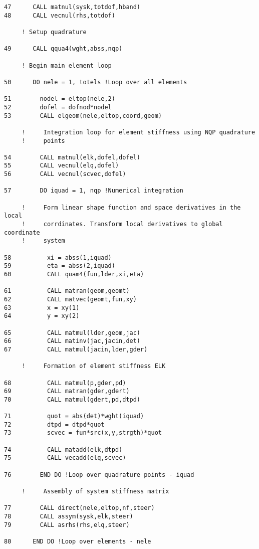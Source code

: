 \begin{verbatim}
47      CALL matnul(sysk,totdof,hband)
48      CALL vecnul(rhs,totdof) 
     
     ! Setup quadrature
     
49      CALL qqua4(wght,abss,nqp)
     
     ! Begin main element loop
     
50      DO nele = 1, totels !Loop over all elements
     
51        nodel = eltop(nele,2)
52        dofel = dofnod*nodel
53        CALL elgeom(nele,eltop,coord,geom)
     
     !     Integration loop for element stiffness using NQP quadrature
     !     points
     
54        CALL matnul(elk,dofel,dofel) 
55        CALL vecnul(elq,dofel)
56        CALL vecnul(scvec,dofel)
     
57        DO iquad = 1, nqp !Numerical integration
     
     !     Form linear shape function and space derivatives in the local
     !     corrdinates. Transform local derivatives to global coordinate
     !     system
     
58          xi = abss(1,iquad)
59          eta = abss(2,iquad)
60          CALL quam4(fun,lder,xi,eta)
     
61          CALL matran(geom,geomt)
62          CALL matvec(geomt,fun,xy) 
63          x = xy(1)
64          y = xy(2)
     
65          CALL matmul(lder,geom,jac) 
66          CALL matinv(jac,jacin,det)
67          CALL matmul(jacin,lder,gder)
     
     !     Formation of element stiffness ELK
     
68          CALL matmul(p,gder,pd)
69          CALL matran(gder,gdert)
70          CALL matmul(gdert,pd,dtpd)
     
71          quot = abs(det)*wght(iquad)
72          dtpd = dtpd*quot
73          scvec = fun*src(x,y,strgth)*quot
     
74          CALL matadd(elk,dtpd)
75          CALL vecadd(elq,scvec)
     
76        END DO !Loop over quadrature points - iquad
     
     !     Assembly of system stiffness matrix
     
77        CALL direct(nele,eltop,nf,steer)
78        CALL assym(sysk,elk,steer)
79        CALL asrhs(rhs,elq,steer)
     
80      END DO !Loop over elements - nele
     

\end{verbatim}
